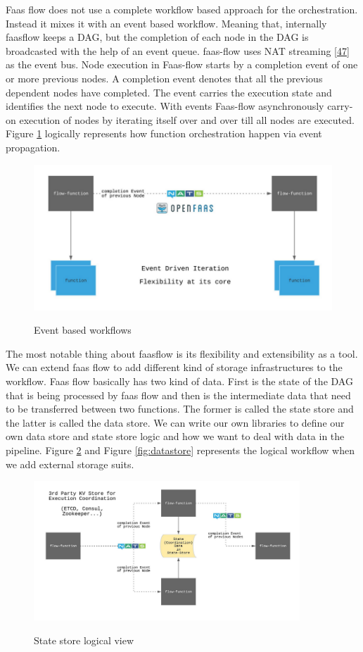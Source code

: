 \documentclass[12pt,titlepage]{article}
\begin{document}
Faas flow does not use a complete workflow based approach for the orchestration.
Instead it mixes it with an event based workflow. Meaning that, internally
faasflow keeps a DAG, but the completion of each node in the DAG is broadcasted
with the help of an event queue. faas-flow uses NAT streaming \hyperref[ref:47]{[47}] as the event
bus. Node execution in Faas-flow starts by a completion event of one or more
previous nodes. A completion event denotes that all the previous dependent nodes
have completed. The event carries the execution state and identifies the next
node to execute. With events Faas-flow asynchronously carry-on execution of
nodes by iterating itself over and over till all nodes are executed. Figure
\ref{fig:nat} logically represents how function orchestration happen via event
propagation.

\begin{figure}[!h]
    \caption{Event based workflows}
    \centering
    \includegraphics[width=130mm]{./thesis_images/nat.png}
    \label{fig:nat}
\end{figure}

The most notable thing about faasflow is its flexibility and extensibility as a
tool. We can extend faas flow to add different kind of storage infrastructures
to the workflow. Faas flow basically has two kind of data. First is the state of
the DAG that is being processed by faas flow and then is the intermediate data
that need to be transferred between two functions. The former is called the state
store and the latter is called the data store.  We can write our own libraries
to define our own data store and state store logic and how we want to deal with
data in the pipeline. Figure \ref{fig:statestore} and Figure \ref{fig:datastore}
represents the logical workflow when we add external storage suits.

\begin{figure}[!h]
    \caption{State store logical view}
    \centering
    \includegraphics[width=100mm]{./thesis_images/statestore.png}
    \label{fig:statestore}
\end{figure}
\end{document}
